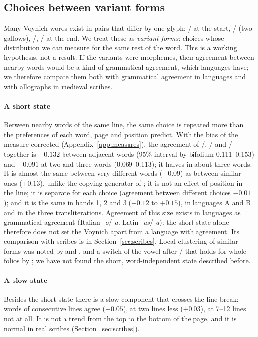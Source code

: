 \subsection{Choices between variant forms}
\label{sec:choices}

Many Voynich words exist in pairs that differ by one glyph: / at the start, / (two
gallows), /, / at the end. We treat these as \emph{variant forms}: choices whose
distribution we can measure for the same rest of the word. This is a working hypothesis, not a result. If the variants
were morphemes, their agreement between nearby words would be a kind of grammatical agreement, which languages have;
we therefore compare them both with grammatical agreement in languages and with allographs in medieval scribes.

\paragraph{A short state} Between nearby words of the same line, the same choice is repeated more than the preferences
of each word, page and position predict. With the bias of the measure corrected (Appendix~\ref{app:measures}), the
agreement of /, / and / together is $+0.132$ between adjacent words
(95\% interval by bifolium 0.111--0.153) and $+0.091$ at two and three words (0.069--0.113); it halves in about three
words. It is almost the same between very different words ($+0.09$) as between similar ones ($+0.13$), unlike the
copying generator of \citet{timmschinner2020}; it is not an effect of position in the line; it is separate for each
choice (agreement between different choices $-0.01$); and it is the same in hands 1, 2 and 3 ($+0.12$ to $+0.15$), in
languages A and B and in the three transliterations. Agreement of this size exists in languages as grammatical
agreement (Italian \emph{-o}/\emph{-a}, Latin \emph{-us}/\emph{-a}); the short state alone therefore does not set the
Voynich apart from a language with agreement. Its comparison with scribes is in Section~\ref{sec:scribes}. Local
clustering of similar forms was noted by \citet{timm2014} and \citet{schinner2007}, and a switch of the vowel after
/ that holds for whole folios by \citet{parisel2026b}; we have not found the short, word-independent state
described before.

\paragraph{A slow state} Besides the short state there is a slow component that crosses the line break: words of
consecutive lines agree ($+0.05$), at two lines less ($+0.03$), at 7--12 lines not at all. It is not a trend from the
top to the bottom of the page, and it is normal in real scribes (Section~\ref{sec:scribes}).


